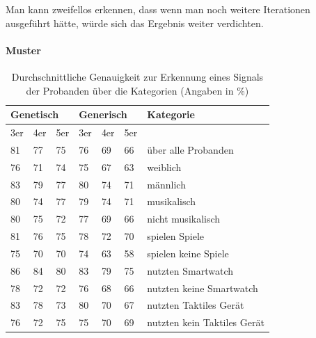 Man kann zweifellos erkennen, dass wenn man noch weitere Iterationen ausgef{\"u}hrt h{\"a}tte, w{\"u}rde sich das Ergebnis weiter verdichten. 



\paragraph{Muster}

\begin{table}[]
\centering
\caption{Durchschnittliche Genauigkeit zur Erkennung eines Signals der Probanden {\"u}ber die Kategorien (Angaben in \%)}
\label{MusterGenauigkeit}
\begin{tabular}{lll|lll|l}
\multicolumn{3}{l}{Genetisch} & \multicolumn{3}{|l|}{Generisch} & Kategorie      \\ \hline
3er    & 4er    & 5er   & 3er    & 4er    & 5er   &                             \\ \hline
81     & 77     & 75    & 76     & 69     & 66    & {\"u}ber alle Probanden         \\ \hline
76     & 71     & 74    & 75     & 67     & 63    & weiblich                    \\
83     & 79     & 77    & 80     & 74     & 71    & m{\"a}nnlich                    \\ \hline
80     & 74     & 77    & 79     & 74     & 71    & musikalisch                 \\
80     & 75     & 72    & 77     & 69     & 66    & nicht musikalisch           \\ \hline
81     & 76     & 75    & 78     & 72     & 70    & spielen Spiele              \\
75     & 70     & 70    & 74     & 63     & 58    & spielen keine Spiele        \\ \hline
86     & 84     & 80    & 83     & 79     & 75    & nutzten Smartwatch          \\
78     & 72     & 72    & 76     & 68     & 66    & nutzten keine Smartwatch    \\ \hline
83     & 78     & 73    & 80     & 70     & 67    & nutzten Taktiles Ger{\"a}t      \\
76     & 72     & 75    & 75     & 70     & 69    & nutzten kein Taktiles Ger{\"a}t
\end{tabular}
\end{table}

